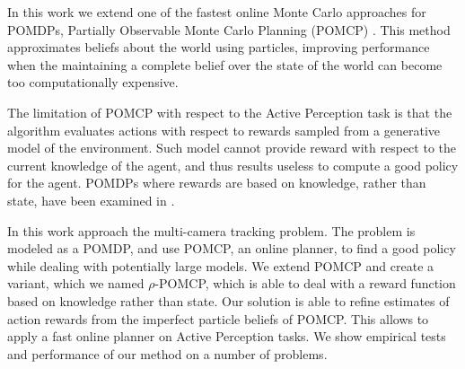 In this work we extend one of the fastest online Monte Carlo approaches for POMDPs, Partially
Observable Monte Carlo Planning (POMCP) \cite{cit:pomcp}. This method approximates beliefs about the
world using particles, improving performance when the maintaining a complete belief over the state
of the world can become too computationally expensive.

The limitation of POMCP with respect to the Active Perception task is that the algorithm evaluates
actions with respect to rewards sampled from a generative model of the environment. Such model
cannot provide reward with respect to the current knowledge of the agent, and thus results useless
to compute a good policy for the agent. POMDPs where rewards are based on knowledge, rather than
state, have been examined in \cite{cit:rpomdp}. 

In this work approach the multi-camera tracking problem. The problem is modeled as a POMDP, and use
POMCP, an online planner, to find a good policy while dealing with potentially large models. We
extend POMCP and create a variant, which we named $\rho$-POMCP, which is able to deal with a reward
function based on knowledge rather than state. Our solution is able to refine estimates of action
rewards from the imperfect particle beliefs of POMCP. This allows to apply a fast online planner on
Active Perception tasks. We show empirical tests and performance of our method on a number of
problems.

